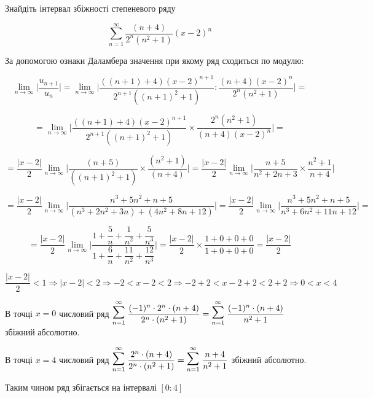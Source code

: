 Знайдіть інтервал збіжності степеневого ряду

$$
  \sum_{n=1}^\infty \dfrac{(n+4)}{2^n(n^2+1)}(x-2)^n
$$


За допомогою ознаки Даламбера значення при якому ряд сходиться по модулю:

$$
\lim_{n \to \infty} \bigg| \dfrac{u_{n+1}}{u_n} \bigg|
= \lim_{n \to \infty} \bigg| \dfrac{((n+1)+4)(x-2)^{n+1}}{2^{n+1}((n+1)^2+1)} : \dfrac{(n+4)(x-2)^n}{2^n(n^2+1)} \bigg| =
$$

$$
= \lim_{n \to \infty} \bigg| \dfrac{((n+1)+4)(x-2)^{n+1}}{2^{n+1}((n+1)^2+1)} \times \dfrac{2^n(n^2+1)}{(n+4)(x-2)^n} \bigg|=
$$

$$
= \dfrac{|x-2|}{2} \lim_{n \to \infty}  \bigg| \dfrac{(n+5)}{((n+1)^2+1)} \times \dfrac{(n^2+1)}{(n+4)} \bigg|
= \dfrac{|x-2|}{2} \lim_{n \to \infty}  \bigg| \dfrac{n+5}{n^2+2n+3} \times \dfrac{n^2+1}{n+4} \bigg|
$$

$$
= \dfrac{|x-2|}{2} \lim_{n \to \infty}  \bigg| \dfrac{n^3+5n^2+n+5}{(n^3+2n^2+3n)+(4n^2+8n+12)} \bigg|
= \dfrac{|x-2|}{2} \lim_{n \to \infty}  \bigg| \dfrac{n^3+5n^2+n+5}{n^3+6n^2+11n+12} \bigg| =
$$

$$
= \dfrac{|x-2|}{2} \lim_{n \to \infty}  \bigg| \dfrac{1+\dfrac{5}{n}+\dfrac{1}{n^2}+\dfrac{5}{n^3}}{1+\dfrac{6}{n}+\dfrac{11}{n^2}+\dfrac{12}{n^3} } \bigg|
= \dfrac{|x-2|}{2} \times \dfrac{1+0+0+0}{1+0+0+0} = \dfrac{|x-2|}{2}
$$



$$
\dfrac{|x-2|}{2} <1
\Rightarrow
|x-2| < 2
\Rightarrow
-2 < x-2 < 2
\Rightarrow
-2 + 2 < x-2+2 < 2+2
\Rightarrow
0 < x < 4
$$


В точці $x=0$ числовий ряд $\Sum{n=1}{\infty} \dfrac{(-1)^n \cdot 2^n \cdot  (n+4)}{2^n \cdot(n^2+1)} = \Sum{n=1}{\infty} \dfrac{(-1)^n \cdot   (n+4)}{ n^2+1} $  збіжний абсолютно.

В точці $x=4$ числовий ряд $\Sum{n=1}{\infty} \dfrac{ 2^n \cdot  (n+4)}{2^n \cdot(n^2+1)} = \Sum{n=1}{\infty} \dfrac{ n+4}{ n^2+1} $ збіжний абсолютно.

Таким чином ряд збігається на інтервалі $\boxed{[0:4]}$

